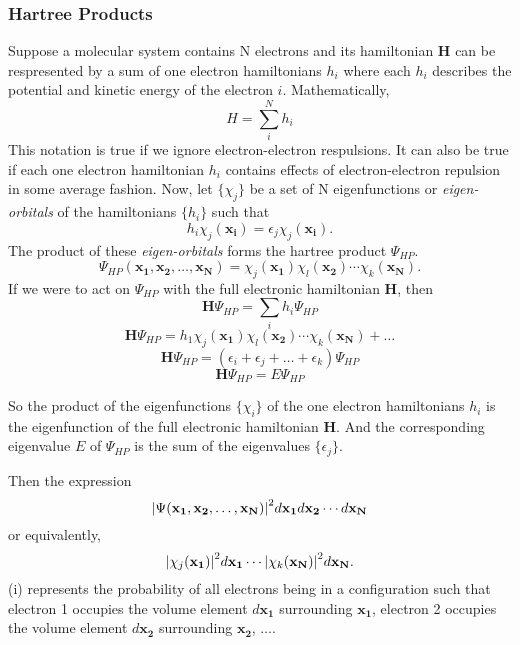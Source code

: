 \documentclass{article}
\begin{document}
      \subsubsection{Hartree Products}

        Suppose a molecular system contains N electrons and its hamiltonian
        \textbf{H} can be
        respresented by a sum of one electron hamiltonians \(h_i\) where
        each \(h_i\) describes the potential and kinetic energy of the
        electron \(i\). Mathematically,
        \[H = \sum_{i}^N h_i\]
        This notation is true if we ignore electron-electron
        respulsions. It can also be true if each one electron
        hamiltonian \(h_i\) contains effects of electron-electron repulsion
        in some average fashion.
        Now, let \(\{\chi_j\}\) be a set of N eigenfunctions or
        \textit{eigen-orbitals} of the hamiltonians \(\{h_i\}\) such that
        \[h_i \chi_j(\mathbf{x_i}) = \epsilon_j \chi_j(\mathbf{x_i}).\]
        The product of these \textit{eigen-orbitals} forms the hartree product
        \(\Psi_{HP}\).
        \[\Psi_{HP}(\mathbf{x_1}, \mathbf{x_2}, \ldots, \mathbf{x_N}) = \chi_j(\mathbf{x_1})\chi_l(\mathbf{x_2})\cdots \chi_k(\mathbf{x_N}).\]
        If we were to act on \(\Psi_{HP}\) with the full electronic hamiltonian
        \textbf{H}, then
          \[\mathbf{H}\Psi_{HP} = \sum_i h_i\Psi_{HP}\]
          \[  \mathbf{H}\Psi_{HP} = h_1\chi_j(\mathbf{x_1})\chi_l(\mathbf{x_2})\cdots \chi_k(\mathbf{x_N}) + \ldots\]
          \[  \mathbf{H}\Psi_{HP} = (\epsilon_i + \epsilon_j +\ldots+ \epsilon_k)\Psi_{HP}\]
          \[  \mathbf{H}\Psi_{HP}= E\Psi_{HP}\]

        So the product of the eigenfunctions \(\{\chi_i\}\) of the one electron
        hamiltonians \(h_i\) is the
        eigenfunction of the full electronic hamiltonian \textbf{H}.
        And the corresponding eigenvalue \(E\) of \(\Psi_{H P}\)
        is the sum of the eigenvalues \(\{\epsilon_j\}\).

        Then the expression
        \[\abs{\Psi(\mathbf{x_1}, \mathbf{x_2}, \ldots, \mathbf{x_N})}^{2}
        d\mathbf{x_1}d\mathbf{x_2}\cdots d\mathbf{x_N}\]
        or equivalently,
        \[\abs{\chi_j(\mathbf{x_1})}^{2}d\mathbf{x_1}\cdots \abs{\chi_k(\mathbf{x_N})}^{2}d\mathbf{x_N}.\]
        (i) represents the probability of all electrons being in a configuration such that
        electron 1 occupies the volume element \(d\mathbf{x_1}\) surrounding
        \(\mathbf{x_1}\), electron 2 occupies the volume element
        \(d\mathbf{x_2}\) surrounding \(\mathbf{x_2}\), \(\ldots\).
\end{document}
